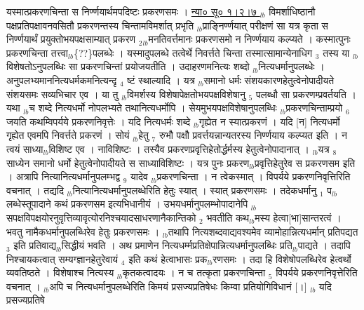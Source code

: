 \documentclass[article,12pt,a4paper]{memoir}%
\begin{document}
	  
	  \pstart \leavevmode%
	\hphantom{.}यस्मात्प्रकरणचिन्ता स निर्ण्णयार्थमपदिष्टः प्रकरणसमः । \href{http://sarit.indology.info/?cref=ns\%C5\%AB.1.2.7}{न्या० सू० १।२।७ } {\tiny $_{lb}$} विमर्शाधिष्ठानौ पक्षप्रतिपक्षावनवसितौ प्रकरणन्तस्य चिन्तामविमर्शात् प्रभृति {\tiny $_{lb}$}प्राङ्निर्ण्णयात् परीक्षणं सा यत्र कृता स निर्ण्णयार्थं प्रयुक्तोभयपक्षसाम्यात् प्रकरण {\tiny $_{2}$}{\tiny $_{lb}$}मनतिवर्त्तमानः प्रकरणसमो न निर्ण्णयाय कल्प्यते । कस्मात्पुनः प्रकरणचिन्ता तत्त्वा{\tiny $_{lb}$}\{??\}पलब्धेः । यस्मादुपलब्धे तत्वेर्थे निवर्त्तते चिन्ता तस्मात्सामान्येनाधिग {\tiny $_{3}$} तस्य या {\tiny $_{lb}$} \leavevmode{} विशेषतोऽनुपलब्धिः सा प्रकरणचिन्तां प्रयोजयतीति । उदाहरणमनित्यः शब्दो {\tiny $_{lb}$}नित्यधर्मानुपलब्धेः । अनुपलभ्यमाननित्यधर्मकमनित्यन्दृ {\tiny $_{4}$} ष्टं स्थाल्यादि । यत्र {\tiny $_{lb}$}समानो धर्मः संशयकारणहेतुत्वेनोपादीयते संशयसमः सव्यभिचार एव । या तु {\tiny $_{lb}$}विमर्शस्य विशेषापेक्षतोभयपक्षविशेषानु {\tiny $_{5}$} पलब्धौ सा प्रकरणम्प्रवर्तयति । यथा {\tiny $_{lb}$}च शब्दे नित्यधर्मो नोपलभ्यते तथानित्यधर्मोपि । सेयमुभयपक्षविशेषानुपलब्धिः {\tiny $_{lb}$}प्रकरणचिन्ताम्प्रयो {\tiny $_{6}$} जयति कथम्विपर्यये प्रकरणनिवृत्तेः । यदि नित्यधर्मः शब्दे {\tiny $_{lb}$}गृह्येत न स्यात्प्रकरणं । यदि [न] नित्यधर्मो गृह्येत एवमपि निवर्त्तते प्रकरणं । सोयं {\tiny $_{lb}$}हेतु {\tiny $_{7}$} रुभौ पक्षौ प्रवर्त्तयन्नान्यतरस्य निर्ण्णयाय कल्प्यत इति । न त्वयं साध्या{\tiny $_{lb}$}विशिष्ट एव । नाविशिष्टः । तस्यैव प्रकरणप्रवृत्तिहेतोर्द्धर्मस्य हेतुत्वेनोपादानात् । {\tiny $_{lb}$}यत्र {\tiny $_{8}$} साध्येन समानो धर्मो हेतुत्वेनोपादीयते स साध्याविशिष्टः । यत्र पुनः प्रकरण{\tiny $_{lb}$}प्रवृत्तिहेतुरेव स प्रकरणसम इति । अत्रापि नित्यानित्यधर्मानुपलम्भद्व {\tiny $_{9}$} \leavevmode{} यादेव {\tiny $_{lb}$}प्रकरणचिन्ता । न त्वेकस्मात् । विपर्यये प्रकरणनिवृत्तिरिति वचनात् । तद्यदि {\tiny $_{lb}$}नित्यानित्यधर्मानुपलब्धेरिति हेतुः स्यात् । स्यात् प्रकरणसमः । तदेकधर्मानु {\tiny $_{1}$} प{\tiny $_{lb}$}लब्धेस्तूपादाने कथं प्रकरणसम इत्यभिधानीयं । उभयधर्मानुपलम्भोपादानेपि {\tiny $_{lb}$}सपक्षविपक्षयोरनुवृत्तिव्यावृत्योरनिश्चयादसाधरणानैकान्तिको {\tiny $_{2}$} भवतीति कथ{\tiny $_{lb}$}मस्य हेत्वा[भा]सान्तरत्वं । भवतु नामैकधर्मानुपलब्धिरेव हेतुः प्रकरणसमः । {\tiny $_{lb}$}तथापि नित्यशब्दवाद्यवश्यमेव व्यामोहान्नित्यधर्मान् प्रतिपद्यत {\tiny $_{3}$} इति प्रतिवाद्य{\tiny $_{lb}$}सिद्धीयं भवति । अथ प्रमाणेन नित्यधर्म्मप्रतिक्षेपान्नित्यधर्मानुपलब्धिः प्रति{\tiny $_{lb}$}पाद्यते । तदापि निश्चायकत्वात् सम्यग्ज्ञानहेतुरेवायं {\tiny $_{4}$} इति कथं हेत्वाभासः प्रक{\tiny $_{lb}$}रणसमः । तदा हि विशेषोपलब्धिरेव हेत्वर्थो व्यवतिष्ठते । विशेषाश्च नित्यस्य {\tiny $_{lb}$}कृतकत्वादयः । न च तत्कृता प्रकरणचिन्ता {\tiny $_{5}$} विपर्यये प्रकरणनिवृत्तेरिति वचनात् । {\tiny $_{lb}$}अपि च नित्यधर्मानुपलब्धेरिति किमयं प्रसज्यप्रतिषेधः किम्वा प्रतियोगिविधानं [।] {\tiny $_{lb}$} यदि प्रसज्यप्रतिषे 
\end{document}
